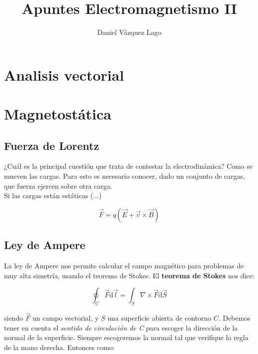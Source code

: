 \documentclass[12pt,a4paper]{article}
\author{Daniel Vázquez Lago}
\title{Apuntes Electromagnetismo II}
\newcommand{\D}{\mathrm{d}}
\newcommand{\rota}{\nabla \times}
\begin{document}
\maketitle

\newpage

\tableofcontents

\newpage

\section{Analisis vectorial}

\section{Magnetostática}

\subsection{Fuerza de Lorentz}

¿Cuál es la principal cuestión que trata de contestar la electrodinámica? Como se mueven las cargas. Para esto es necesario conocer, dado un conjunto de cargas, que fuerza ejercen sobre otra carga. \\

Si las cargas están estáticas (...)

\begin{equation}
\vec{F} = q (\vec{E} + \vec{v} \times \vec{B})
\end{equation}

\subsection{Ley de Ampere}

La ley de Ampere nos permite calcular el campo magnético para problemas de muy alta simetría, usando el teorema de Stokes. El \textbf{teorema de Stokes} nos dice:

\begin{equation}
\oint_C \vec{F} \D \vec{l} = \int_S \rota \vec{F} \D \vec{S}
\end{equation}

siendo $\vec{F}$ un campo vectorial, y $S$ una superficie abierta de contorno $C$. Debemos tener en cuenta el \textit{sentido de circulación de C} para escoger la dirección de la normal de la superficie. Siempre escogeremos la normal tal que verifique la regla de la mano derecha. Entonces como:
\end{document}
